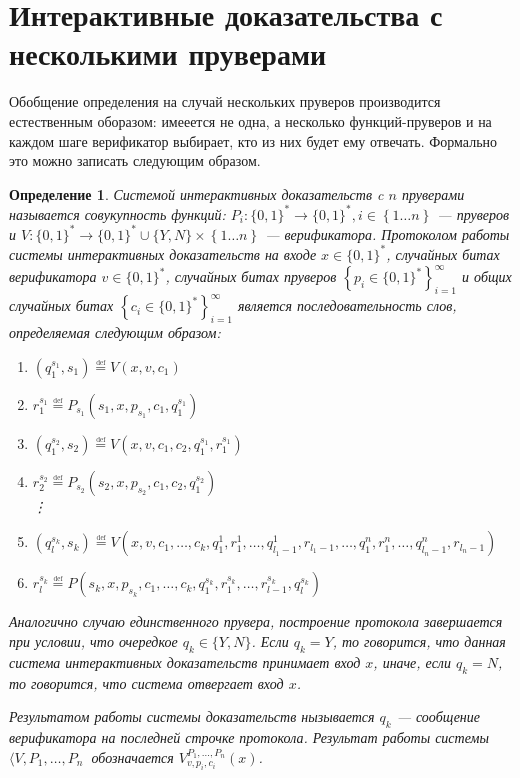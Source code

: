 \documentclass[14pt, a4paper, russian]{report}
\newtheorem{definition}{\indent Определение}
\newcommand{\word}{\{0, 1\}^*}
\newcommand{\defeq}{\overset{\underset{\mathrm{def}}{}}{=}}
\newcommand{\set}[1]{\left\{#1\right\}}
\begin{document}
\section{Интерактивные доказательства с несколькими пруверами}
Обобщение определения на случай нескольких пруверов производится естественным оборазом: имееется не одна, а несколько функций-пруверов и на каждом шаге верификатор выбирает, кто из них будет ему отвечать. Формально это можно записать следующим образом.
\begin{definition}\label{mip_system}
    Системой интерактивных доказательств c $n$ пруверами называется совукупность функций: $P_i: \word \longrightarrow \word, i \in \set{1\ldots n}$ --- пруверов и $V: \word \longrightarrow \word \cup \{Y, N\} \times \set{1 \dots n}$ --- верификатора. Протоколом работы системы интерактивных доказательств на входе $x \in \word$, случайных битах верификатора $v \in \word$, случайных битах пруверов $\left\{p_i\in \word\right\}_{i=1}^{\infty}$ и общих случайных битах $\left\{c_i\in \word\right\}_{i=1}^{\infty}$ является последовательность слов, определяемая следующим образом:
    \begin{enumerate}
        \item $(q^{s_1}_1, s_1) \defeq V(x, v, c_1)$
        \item $r^{s_1}_1 \defeq P_{s_1}(s_1, x, p_{s_1}, c_1, q^{s_1}_1)$
        \item $(q^{s_2}_1, s_2) \defeq V(x, v, c_1, c_2, q^{s_1}_1, r^{s_1}_1)$
        \item $r^{s_2}_2 \defeq P_{s_2}(s_2, x, p_{s_2}, c_1, c_2, q^{s_2}_1)$\\
            \vdots
        \item $(q^{s_k}_l, s_k) \defeq V(x, v, c_1, \ldots, c_k, q^1_1, r^1_1, \ldots, q^1_{l_1-1}, r_{l_1-1}, \ldots, q^n_1, r^n_1, \ldots, q^n_{l_n-1}, r_{l_n-1})$
        \item $r^{s_k}_l \defeq P(s_k, x, p_{s_k}, c_1, \ldots, c_k, q^{s_k}_1, r^{s_k}_1, \ldots, r^{s_k}_{l-1}, q^{s_k}_l)$
    \end{enumerate}
    Аналогично случаю единственного прувера, построение протокола завершается при условии, что очередкое $q_k \in \{Y, N\}$. Если $q_k = Y$, то говорится, что данная система интерактивных доказательств принимает вход $x$, иначе, если $q_k = N$, то говорится, что система отвергает вход $x$.

    Результатом работы системы доказательств нызывается $q_k$ --- сообщение верификатора на последней строчке протокола. Результат работы системы $\langle V, P_1, \ldots, P_n\>$ обозначается $V^{P_1, \ldots, P_n}_{v, p_i, c_i}(x)$.
\end{definition}
\end{document}
